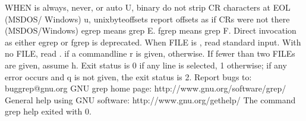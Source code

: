 \documentclass[letterpaper,12pt,english]{sphinxmanual}
\begin{document}
\begin{sphinxVerbatim}[commandchars=\\\{\}]
                            WHEN is \PYGZsq{}always\PYGZsq{}, \PYGZsq{}never\PYGZsq{}, or \PYGZsq{}auto\PYGZsq{}
  \PYGZhy{}U, \PYGZhy{}\PYGZhy{}binary              do not strip CR characters at EOL (MSDOS/   Windows)
  \PYGZhy{}u, \PYGZhy{}\PYGZhy{}unix\PYGZhy{}byte\PYGZhy{}offsets   report offsets as if CRs were not there
                            (MSDOS/Windows)
\PYGZsq{}egrep\PYGZsq{} means \PYGZsq{}grep \PYGZhy{}E\PYGZsq{}.  \PYGZsq{}fgrep\PYGZsq{} means \PYGZsq{}grep \PYGZhy{}F\PYGZsq{}.
Direct invocation as either \PYGZsq{}egrep\PYGZsq{} or \PYGZsq{}fgrep\PYGZsq{} is deprecated.
When FILE is \PYGZhy{}, read standard input.  With no FILE, read . if a    command\PYGZhy{}line
\PYGZhy{}r is given, \PYGZhy{} otherwise.  If fewer than two FILEs are given, assume \PYGZhy{}h.
Exit status is 0 if any line is selected, 1 otherwise;
if any error occurs and \PYGZhy{}q is not given, the exit status is 2.
Report bugs to: bug\PYGZhy{}grep@gnu.org
GNU grep home page: \PYGZlt{}http://www.gnu.org/software/grep/\PYGZgt{}
General help using GNU software: \PYGZlt{}http://www.gnu.org/gethelp/\PYGZgt{}
The command \PYGZdq{}grep \PYGZhy{}\PYGZhy{}help\PYGZdq{} exited with 0.
\end{sphinxVerbatim}
\end{document}
